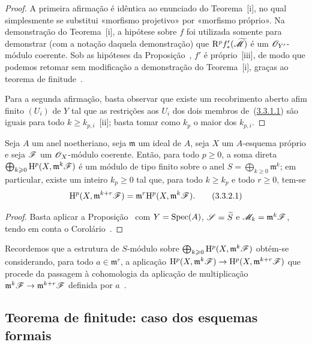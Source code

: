 \begin{proof}
A primeira afirmação é idêntica ao enunciado do Teorema~[i], no qual simplesmente se substitui «morfismo projetivo» por «morfismo próprio».
Na demonstração do Teorema~[i], a hipótese sobre $f$ foi utilizada somente para demonstrar (com a notação daquela demonstração) que $\mathrm{R}^p f_*'(\widetilde{\mathscr{M}})$ é um $\mathscr{O}_{Y'}$-módulo coerente.
Sob as hipóteses da Proposição~, $f'$ é próprio~[iii], de modo que podemos retomar sem modificação a demonstração do Teorema~[i], graças ao teorema de finitude~.

Para a segunda afirmação, basta observar que existe um recobrimento aberto afim finito $(U_i)$ de $Y$ tal que as restrições aos $U_i$ dos dois membros de~(\hyperref[III.3.3.1.1]{3.3.1.1}) são iguais para todo $k\geq k_{p,i}$~[ii]; basta tomar como $k_p$ o maior dos $k_{p,i}$.
\end{proof}

\begin{corollary}[3.3.2]
\label{III.3.3.2}
Seja $A$ um anel noetheriano, seja $\mathfrak{m}$ um ideal de $A$, seja $X$ um $A$-esquema próprio e seja $\mathscr{F}$ um $\mathscr{O}_X$-módulo coerente.
Então, para todo $p\geq 0$, a soma direta $\bigoplus_{k\geqslant 0}\mathrm{H}^p(X,\mathfrak{m}^k\mathscr{F})$ é um módulo de tipo finito sobre o anel $S=\bigoplus_{k\geq 0}\mathfrak{m}^k$; em particular, existe um inteiro $k_p\geq 0$ tal que, para todo $k\geq k_p$ e todo $r\geq 0$, tem-se
\[
\label{III.3.3.2.1}
  \HH^p(X,\mathfrak{m}^{k+r}\sh{F})=\mathfrak{m}^r\HH^p(X,\mathfrak{m}^k\sh{F}).
  \tag{3.3.2.1}
\]
\end{corollary}

\begin{proof}
Basta aplicar a Proposição~ com $Y=\operatorname{Spec}(A)$, $\mathscr{S}=\widetilde{S}$ e $\mathscr{M}_k=\mathfrak{m}^k\mathscr{F}$, tendo em conta o Corolário~.
\end{proof}

Recordemos que a estrutura de $S$-módulo sobre $\bigoplus_{k\geqslant 0}\mathrm{H}^p(X,\mathfrak{m}^k\mathscr{F})$ obtém-se considerando, para todo $a\in\mathfrak{m}^r$, a aplicação $\HH^p(X,\mathfrak{m}^k\sh{F})\to\HH^p(X,\mathfrak{m}^{k+r}\sh{F})$ que procede da passagem à cohomologia da aplicação de multiplicação $\mathfrak{m}^k\sh{F}\to\mathfrak{m}^{k+r}\sh{F}$ definida por $a$~.

\subsection{Teorema de finitude: caso dos esquemas formais}
\label{subsection:III.3.4}

